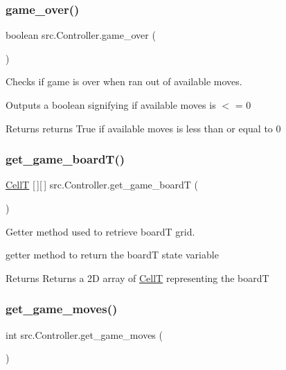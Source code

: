 \subsubsection{\texorpdfstring{game\+\_\+over()}{game\_over()}}
{\footnotesize\ttfamily boolean src.\+Controller.\+game\+\_\+over (\begin{DoxyParamCaption}{ }\end{DoxyParamCaption})}



Checks if game is over when ran out of available moves. 

Outputs a boolean signifying if available moves is $<$ = 0 \begin{DoxyReturn}{Returns}
returns True if available moves is less than or equal to 0 
\end{DoxyReturn}
\mbox{\label{classsrc_1_1Controller_af977f21ac362867f8a347b18a3daab74}} 
\subsubsection{\texorpdfstring{get\+\_\+game\+\_\+board\+T()}{get\_game\_boardT()}}
{\footnotesize\ttfamily \hyperlink{enumsrc_1_1CellT}{CellT} \mbox{[}$\,$\mbox{]}\mbox{[}$\,$\mbox{]} src.\+Controller.\+get\+\_\+game\+\_\+boardT (\begin{DoxyParamCaption}{ }\end{DoxyParamCaption})}



Getter method used to retrieve boardT grid. 

getter method to return the boardT state variable \begin{DoxyReturn}{Returns}
Returns a 2D array of \hyperlink{enumsrc_1_1CellT}{CellT} representing the boardT 
\end{DoxyReturn}
\mbox{\label{classsrc_1_1Controller_adea400edf10a1561c5832f86a81d805b}} 
\subsubsection{\texorpdfstring{get\+\_\+game\+\_\+moves()}{get\_game\_moves()}}
{\footnotesize\ttfamily int src.\+Controller.\+get\+\_\+game\+\_\+moves (\begin{DoxyParamCaption}{ }\end{DoxyParamCaption})}



